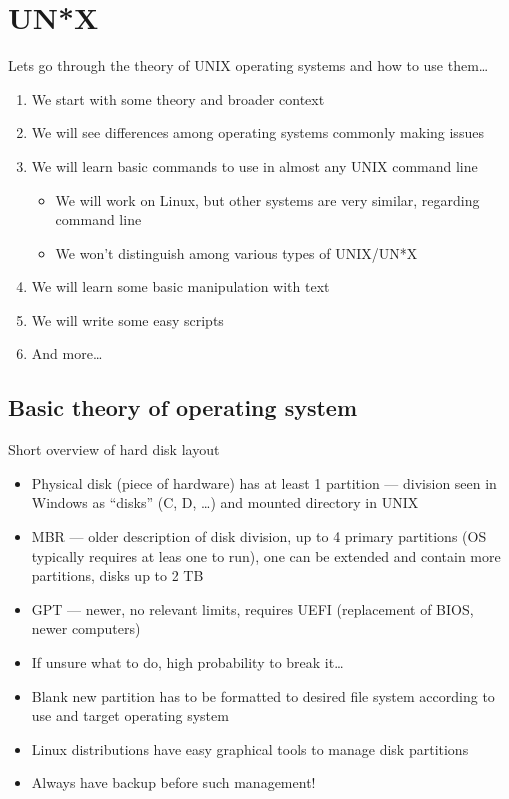 \documentclass[hyperref={bookmarks=true, unicode=true, colorlinks=true, pdftitle={Linux, command line and MetaCentrum}, plainpages=false, pdfauthor={Vojtech Zeisek}, pdfsubject={Course about use of Linux command line, writing shell scripts and using MetaCentrum of CESNET}, pdfcreator={XeLaTeX, http://www.xelatex.org/}, pdfkeywords={Linux, GNU, BASH, shell, command line, MetaCentrum}, linkcolor=Sienna, anchorcolor=black, citecolor=green, filecolor=magenta, menucolor=Sienna, urlcolor=cyan, pdftex}, compress, ucs, xelatex, xcolor=svgnames, 11pt]{beamer}
\begin{document}
\section{UN*X}

\begin{frame}{Lets go through the theory of UNIX operating systems and how to use them\ldots}
\begin{enumerate}
  \item We start with some theory and broader context
  \item We will see differences among operating systems commonly making issues
  \item We will learn basic commands to use in almost any UNIX command line
  \begin{itemize}
    \item We will work on Linux, but other systems are very similar, regarding command line
    \item We won't distinguish among various types of UNIX/UN*X
  \end{itemize}
  \item We will learn some basic manipulation with text
  \item We will write some easy scripts
  \item And more\ldots
\end{enumerate}
\end{frame}

\subsection{Basic theory of operating system}

\begin{frame}{Short overview of hard disk layout}
\begin{itemize}
  \item Physical disk (piece of hardware) has at least 1 partition --- division seen in Windows as ``disks'' (C, D, \ldots) and mounted directory in UNIX
  \item MBR --- older description of disk division, up to 4 primary partitions (OS typically requires at leas one to run), one can be extended and contain more partitions, disks up to 2 TB
  \item GPT --- newer, no relevant limits, requires UEFI (replacement of BIOS, newer computers)
  \item If unsure what to do, high probability to break it\ldots
  \item Blank new partition has to be formatted to desired file system according to use and target operating system
  \item Linux distributions have easy graphical tools to manage disk partitions
  \item Always have backup before such management!
\end{itemize}
\end{frame}
\end{document}
